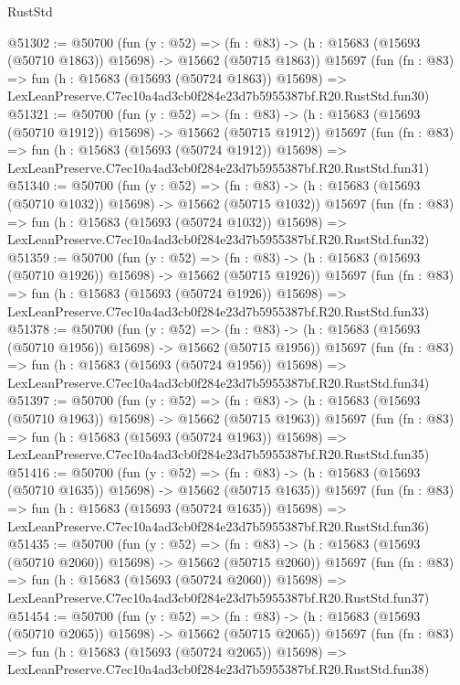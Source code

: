 \begin{lexlean}{RustStd}
\begin{coremodule}
@51302 := @50700
    (fun (y : @52) =>
    (fn : @83) -> (h : @15683 (@15693 (@50710 @1863)) @15698) -> @15662 (@50715 @1863))
    @15697
    (fun (fn : @83) =>
    fun (h : @15683 (@15693 (@50724 @1863)) @15698) =>
    LexLeanPreserve.C7ec10a4ad3cb0f284e23d7b5955387bf.R20.RustStd.fun30)
@51321 := @50700
    (fun (y : @52) =>
    (fn : @83) -> (h : @15683 (@15693 (@50710 @1912)) @15698) -> @15662 (@50715 @1912))
    @15697
    (fun (fn : @83) =>
    fun (h : @15683 (@15693 (@50724 @1912)) @15698) =>
    LexLeanPreserve.C7ec10a4ad3cb0f284e23d7b5955387bf.R20.RustStd.fun31)
@51340 := @50700
    (fun (y : @52) =>
    (fn : @83) -> (h : @15683 (@15693 (@50710 @1032)) @15698) -> @15662 (@50715 @1032))
    @15697
    (fun (fn : @83) =>
    fun (h : @15683 (@15693 (@50724 @1032)) @15698) =>
    LexLeanPreserve.C7ec10a4ad3cb0f284e23d7b5955387bf.R20.RustStd.fun32)
@51359 := @50700
    (fun (y : @52) =>
    (fn : @83) -> (h : @15683 (@15693 (@50710 @1926)) @15698) -> @15662 (@50715 @1926))
    @15697
    (fun (fn : @83) =>
    fun (h : @15683 (@15693 (@50724 @1926)) @15698) =>
    LexLeanPreserve.C7ec10a4ad3cb0f284e23d7b5955387bf.R20.RustStd.fun33)
@51378 := @50700
    (fun (y : @52) =>
    (fn : @83) -> (h : @15683 (@15693 (@50710 @1956)) @15698) -> @15662 (@50715 @1956))
    @15697
    (fun (fn : @83) =>
    fun (h : @15683 (@15693 (@50724 @1956)) @15698) =>
    LexLeanPreserve.C7ec10a4ad3cb0f284e23d7b5955387bf.R20.RustStd.fun34)
@51397 := @50700
    (fun (y : @52) =>
    (fn : @83) -> (h : @15683 (@15693 (@50710 @1963)) @15698) -> @15662 (@50715 @1963))
    @15697
    (fun (fn : @83) =>
    fun (h : @15683 (@15693 (@50724 @1963)) @15698) =>
    LexLeanPreserve.C7ec10a4ad3cb0f284e23d7b5955387bf.R20.RustStd.fun35)
@51416 := @50700
    (fun (y : @52) =>
    (fn : @83) -> (h : @15683 (@15693 (@50710 @1635)) @15698) -> @15662 (@50715 @1635))
    @15697
    (fun (fn : @83) =>
    fun (h : @15683 (@15693 (@50724 @1635)) @15698) =>
    LexLeanPreserve.C7ec10a4ad3cb0f284e23d7b5955387bf.R20.RustStd.fun36)
@51435 := @50700
    (fun (y : @52) =>
    (fn : @83) -> (h : @15683 (@15693 (@50710 @2060)) @15698) -> @15662 (@50715 @2060))
    @15697
    (fun (fn : @83) =>
    fun (h : @15683 (@15693 (@50724 @2060)) @15698) =>
    LexLeanPreserve.C7ec10a4ad3cb0f284e23d7b5955387bf.R20.RustStd.fun37)
@51454 := @50700
    (fun (y : @52) =>
    (fn : @83) -> (h : @15683 (@15693 (@50710 @2065)) @15698) -> @15662 (@50715 @2065))
    @15697
    (fun (fn : @83) =>
    fun (h : @15683 (@15693 (@50724 @2065)) @15698) =>
    LexLeanPreserve.C7ec10a4ad3cb0f284e23d7b5955387bf.R20.RustStd.fun38)

\end{coremodule}
\end{lexlean}
